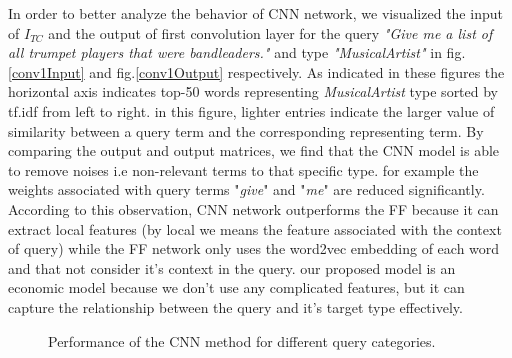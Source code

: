 In order to better analyze the behavior of CNN network, we visualized the input of $I_{TC}$ and the output of first convolution layer for the query \textit{"Give me a list of all trumpet players that were bandleaders."} and type \textit{"MusicalArtist"} in fig.\ref{conv1Input} and fig.\ref{conv1Output} respectively. As indicated in these figures the horizontal axis indicates top-50 words representing \textit{MusicalArtist} type sorted by tf.idf from left to right. in this figure, lighter entries indicate the larger value of similarity between a query term and the corresponding representing term. By comparing the output and output matrices, we find that the CNN model is able to remove noises i.e non-relevant terms to that specific type. for example the weights associated with query terms "\textit{give}" and "\textit{me}" are reduced significantly. According to this observation, CNN network outperforms the FF because it can extract local features (by local we means the feature associated with the context of query) while the FF network only uses the word2vec embedding of each word and that not consider it's context in the query. our proposed model is an economic model because we don't use any complicated features, but it can capture the relationship between the query and it's target type effectively.     



\shrink
\begin{figure}
	\shrink
	\caption{Performance of the CNN method for different query categories.}

\end{figure}

